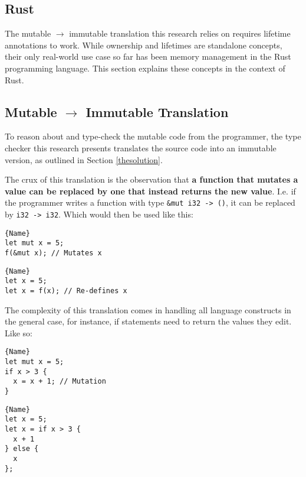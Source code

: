 \documentclass[12pt,twoside]{report}
\begin{document}
\subsection{Rust}
The mutable $\rightarrow$ immutable translation this research relies on requires lifetime annotations to work. While ownership and lifetimes are standalone concepts, their only real-world use case so far has been memory management in the Rust programming language. This section explains these concepts in the context of Rust.


\subsection{Mutable $\rightarrow$ Immutable Translation}
To reason about and type-check the mutable code from the programmer, the type checker this research presents translates the source code into an immutable version, as outlined in Section \ref{thesolution}.

The crux of this translation is the observation that \textbf{a function that mutates a value can be replaced by one that instead returns the new value}. I.e. if the programmer writes a function with type \verb|&mut i32 -> ()|, it can be replaced by \verb|i32 -> i32|. Which would then be used like this:

\noindent\begin{minipage}{.45\textwidth}
\begin{lstlisting}[caption=Original]{Name}
let mut x = 5;
f(&mut x); // Mutates x
\end{lstlisting}
\end{minipage}\hfill
\begin{minipage}{.45\textwidth}
\begin{lstlisting}[caption=Translated]{Name}
let x = 5;
let x = f(x); // Re-defines x
\end{lstlisting}
\end{minipage}

The complexity of this translation comes in handling all language constructs in the general case, for instance, if statements need to return the values they edit. Like so:

\noindent\begin{minipage}{.45\textwidth}
\begin{lstlisting}[caption=Original]{Name}
let mut x = 5;
if x > 3 {
  x = x + 1; // Mutation
}
\end{lstlisting}
\end{minipage}\hfill
\begin{minipage}{.45\textwidth}
\begin{lstlisting}[caption=Translated]{Name}
let x = 5;
let x = if x > 3 {
  x + 1
} else {
  x
};
\end{lstlisting}
\end{minipage}
\end{document}

